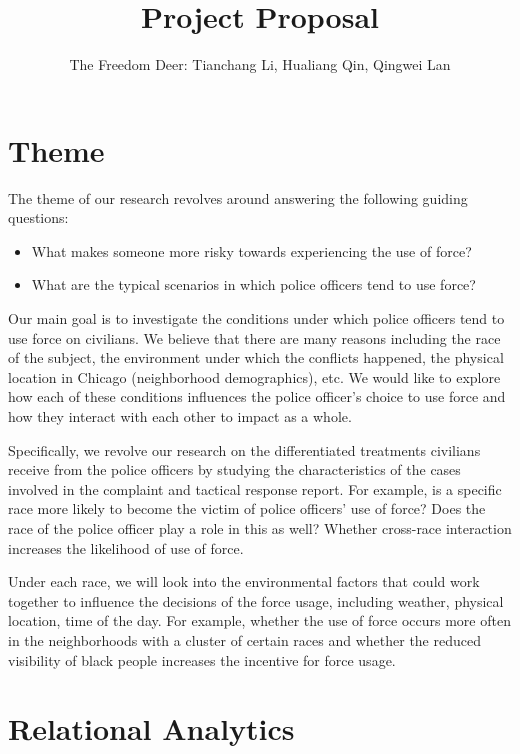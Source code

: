 \documentclass[10pt]{article}
\title{Project Proposal}
\author{The Freedom Deer: Tianchang Li, Hualiang Qin, Qingwei Lan}
\begin{document}
\maketitle


\section{Theme}

The theme of our research revolves around answering the following guiding questions:
\begin{itemize}
\setlength\itemsep{0em}
\item What makes someone more risky towards experiencing the use of force?
\item What are the typical scenarios in which police officers tend to use force?
\end{itemize}

Our main goal is to investigate the conditions under which police officers tend to use force on civilians. We believe that there are many reasons including the race of the subject, the environment under which the conflicts happened, the physical location in Chicago (neighborhood demographics), etc. We would like to explore how each of these conditions influences the police officer’s choice to use force and how they interact with each other to impact as a whole.

Specifically, we revolve our research on the differentiated treatments civilians receive from the police officers by studying the characteristics of the cases involved in the complaint and tactical response report. For example, is a specific race more likely to become the victim of police officers’ use of force? Does the race of the police officer play a role in this as well? Whether cross-race interaction increases the likelihood of use of force.

Under each race, we will look into the environmental factors that could work together to influence the decisions of the force usage, including weather, physical location, time of the day. For example, whether the use of force occurs more often in the neighborhoods with a cluster of certain races and whether the reduced visibility of black people increases the incentive for force usage.



\section{Relational Analytics}
\end{document}
